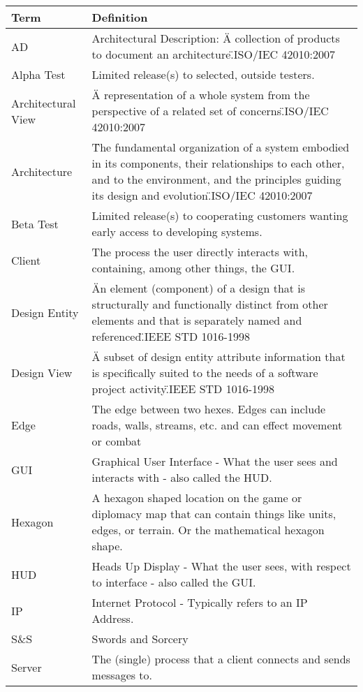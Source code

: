 \documentclass[12pt,a4paper]{article}
\begin{document}
\begin{center}
\begin{tabularx}{\linewidth}{|p{1.5in}|X|}\hline
\textbf{Term} & \textbf{Definition}\\
\hline
AD & Architectural Description: \"A collection of products to document an architecture.\"\space ISO/IEC 42010:2007\\
\hline
Alpha Test & Limited release(s) to selected, outside testers.\\
\hline
Architectural View & \"A representation of a whole system from the perspective of a related set of concerns.\"\space ISO/IEC 42010:2007\\
\hline
Architecture & \"The fundamental organization of a system embodied in its components, their relationships to each other, and to the environment, and the principles guiding its design and evolution.\"\space ISO/IEC 42010:2007\\
\hline
Beta Test & Limited release(s) to cooperating customers wanting early access to developing systems.\\
\hline
Client & The process the user directly interacts with, containing, among other things, the GUI.\\
\hline
Design Entity & \"An element (component) of a design that is structurally and functionally distinct from other elements and that is separately named and referenced.\"\space IEEE STD 1016-1998\\
\hline
Design View & \"A subset of design entity attribute information that is specifically suited to the needs of a software project activity.\"\space IEEE STD 1016-1998\\
\hline
Edge & The edge between two hexes. Edges can include roads, walls, streams, etc. and can effect movement or combat\\
\hline
GUI & Graphical User Interface - What the user sees and interacts with - also called the HUD.\\
\hline
Hexagon & A hexagon shaped location on the game or diplomacy map that can contain things like units, edges, or terrain. Or the mathematical hexagon shape.\\
\hline
HUD & Heads Up Display - What the user sees, with respect to interface - also called the GUI.\\
\hline
IP & Internet Protocol - Typically refers to an IP Address.\\
\hline
S\&S & Swords and Sorcery\\
\hline
Server & The (single) process that a client connects and sends messages to. \\

\end{tabularx}
\end{center}
\end{document}
